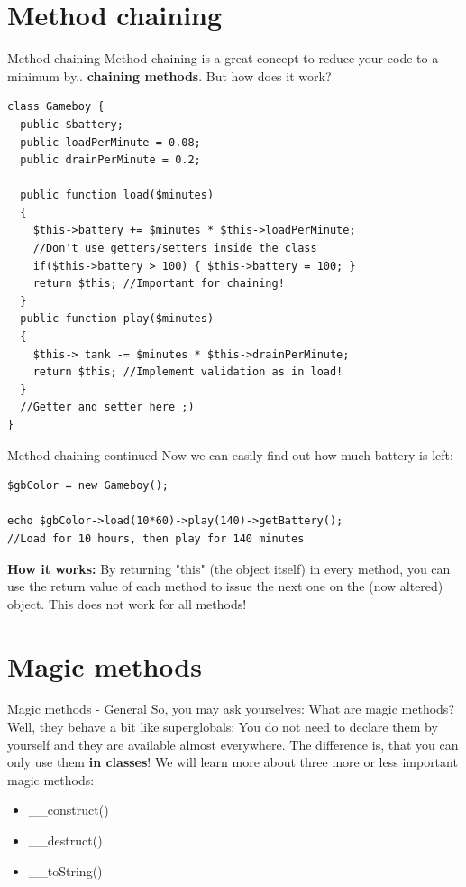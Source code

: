 \section{Method chaining}

\begin{frame}[fragile]{Method chaining}
Method chaining is a great concept to reduce your code to a minimum by.. \textbf{chaining methods}. But how does it work? \pause
\begin{lstlisting}
class Gameboy {
  public $battery;
  public loadPerMinute = 0.08;
  public drainPerMinute = 0.2;

  public function load($minutes)
  {
    $this->battery += $minutes * $this->loadPerMinute; 
    //Don't use getters/setters inside the class
 	if($this->battery > 100) { $this->battery = 100; }
    return $this; //Important for chaining!
  }
  public function play($minutes)
  {
    $this-> tank -= $minutes * $this->drainPerMinute;
    return $this; //Implement validation as in load!
  }
  //Getter and setter here ;)
}
\end{lstlisting}
\end{frame}


\begin{frame}[fragile]{Method chaining continued}
Now we can easily find out how much battery is left: \pause
\begin{lstlisting}
$gbColor = new Gameboy();

echo $gbColor->load(10*60)->play(140)->getBattery();
//Load for 10 hours, then play for 140 minutes
\end{lstlisting} \pause
\textbf{How it works:} By returning "this" (the object itself) in every method, you can use the return value of each method to issue the next one on the (now altered) object. \pause This does not work for all methods!
\end{frame}


\section{Magic methods}

\begin{frame}[fragile]{Magic methods - General}
So, you may ask yourselves: What are magic methods? \pause
Well, they behave a bit like superglobals: You do not need to declare them by yourself and they are available almost everywhere. \pause The difference is, that you can only use them \textbf{in classes}! We will learn more about three more or less important magic methods: \pause
\begin{itemize}
	\item \_{}\_{}construct()
	\item \_{}\_{}destruct()
	\item \_{}\_{}toString()
\end{itemize}
\end{frame}

